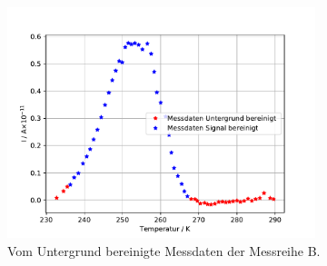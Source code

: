 \begin{figure}
    \centering
    \includegraphics[width=0.8\textwidth,keepaspectratio]{figure/Messdate_rein_B.pdf}
    \caption{Vom Untergrund bereinigte Messdaten der Messreihe B.}
    \label{fig:Messdaten_bereinigt_B}
\end{figure}
\FloatBarrier

